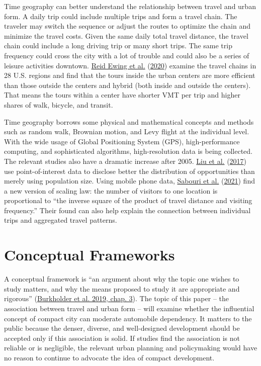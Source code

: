 \documentclass[
  12pt,
]{article}
\begin{document}
Time geography can better understand the relationship between travel and urban form. A daily trip could include multiple trips and form a travel chain. The traveler may switch the sequence or adjust the routes to optimize the chain and minimize the travel costs. Given the same daily total travel distance, the travel chain could include a long driving trip or many short trips. The same trip frequency could cross the city with a lot of trouble and could also be a series of leisure activities downtown. \protect\hyperlink{ref-ewingReducingVehicleMiles2020}{Reid Ewing et al.} (\protect\hyperlink{ref-ewingReducingVehicleMiles2020}{2020}) examine the travel chains in 28 U.S. regions and find that the tours inside the urban centers are more efficient than those outside the centers and hybrid (both inside and outside the centers). That means the tours within a center have shorter VMT per trip and higher shares of walk, bicycle, and transit.

Time geography borrows some physical and mathematical concepts and methods such as random walk, Brownian motion, and Levy flight at the individual level. With the wide usage of Global Positioning System (GPS), high-performance computing, and sophisticated algorithms, high-resolution data is being collected. The relevant studies also have a dramatic increase after 2005. \protect\hyperlink{ref-liuPointofInterestDemandModeling2017}{Liu et al.} (\protect\hyperlink{ref-liuPointofInterestDemandModeling2017}{2017}) use point-of-interest data to disclose better the distribution of opportunities than merely using population size. Using mobile phone data, \protect\hyperlink{ref-sabouriBuiltEnvironmentVehicle2021}{Sabouri et al.} (\protect\hyperlink{ref-sabouriBuiltEnvironmentVehicle2021}{2021}) find a new version of scaling law: the number of visitors to one location is proportional to ``the inverse square of the product of travel distance and visiting frequency.'' Their found can also help explain the connection between individual trips and aggregated travel patterns.

\hypertarget{struc}{%
\section{Conceptual Frameworks}\label{struc}}

A conceptual framework is ``an argument about why the topic one wishes to study matters, and why the means proposed to study it are appropriate and rigorous'' (\protect\hyperlink{ref-burkholderResearchDesignMethods2019}{Burkholder et al. 2019, chap. 3}). The topic of this paper -- the association between travel and urban form -- will examine whether the influential concept of compact city can moderate automobile dependency. It matters to the public because the denser, diverse, and well-designed development should be accepted only if this association is solid. If studies find the association is not reliable or is negligible, the relevant urban planning and policymaking would have no reason to continue to advocate the idea of compact development.
\end{document}
